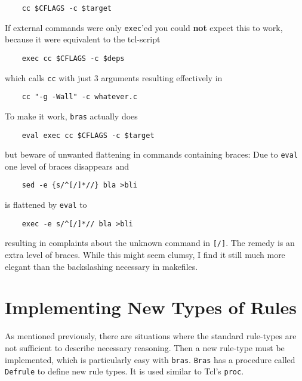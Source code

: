 \documentclass[12pt]{article}
\newcommand{\bras}{\texttt{bras}}
\newcommand{\Bras}{\texttt{Bras}}
\begin{document}
\begin{verbatim}
    cc $CFLAGS -c $target
\end{verbatim}

If external commands were only \texttt{exec}'ed you could \textbf{not}
expect this to work, because it were equivalent to the tcl-script

\begin{verbatim}
    exec cc $CFLAGS -c $deps
\end{verbatim}

which calls \texttt{cc} with just 3 arguments resulting effectively in

\begin{verbatim}
    cc "-g -Wall" -c whatever.c
\end{verbatim}

To make it work, \bras{} actually does

\begin{verbatim}
    eval exec cc $CFLAGS -c $target
\end{verbatim}

but beware of unwanted flattening in commands containing braces: Due
to \texttt{eval} one level of braces
disappears and

\begin{verbatim}
    sed -e {s/^[/]*//} bla >bli
\end{verbatim}

is flattened by \texttt{eval} to

\begin{verbatim}
    exec -e s/^[/]*// bla >bli
\end{verbatim}

resulting in complaints about the unknown command in
\texttt{[/]}. The remedy is an extra level of braces. While this might
seem clumsy, I find it still much more elegant than the backslashing
necessary in makefiles.


\section{Implementing New Types of Rules}
\label{secNewRules}
As mentioned previously, there are situations where the standard
rule-types are not sufficient to describe necessary reasoning. Then a
new rule-type must be implemented, which is particularly easy with
\bras{}. \Bras{} has a procedure called
\texttt{Defrule} to define new rule types. It is used similar to Tcl's
\texttt{proc}.
\end{document}
